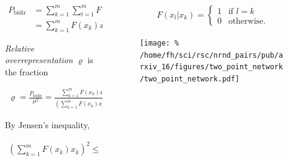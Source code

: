 \begin{frame}{}

    \begin{columns}
      \begin{column}{.5\textwidth}
        \minipage[c][0.85\textheight][s]{\columnwidth}

        \begin{align*}
          P_{\text{bidir}} &= \sum_{k=1}^m \sum_{l=1}^m F(x_k) x_k F(x_l | x_k) x_l \\ &= \sum_{k=1}^m F(x_k) x_k^2 .
\end{align*}


\textit{Relative overrepresentation} $\varrho$ is the fraction

\begin{align*}
  \varrho = \frac{P_{\text{bidir}}}{\mu^2} = \frac{\sum_{k=1}^m F(x_k) x_k^2 }{\left(\sum_{k=1}^m F(x_k) x_k\right)^2}.
\end{align*}

By Jensen's inequality,

\begin{align*}
  \left(\sum_{k=1}^m F(x_k) x_k\right)^2 \leq \sum_{k=1}^m F(x_k) x_k^2  \quad \text{and thus} \quad \varrho \geq 1.
\end{align*}	

        
        \endminipage      
      \end{column}
      \begin{column}{.5\textwidth}
        \minipage[c][0.85\textheight][s]{\columnwidth}

        \begin{align*}
  F(x_l | x_k) = \begin{cases} 1 & \text{if $l = k$} \\ 0 & \text{otherwise.} \end{cases}
        \end{align*}


        
        \begin{figure}
          \centering
          \texttt{[image: \%
          /home/fh/sci/rsc/nrnd\_pairs/pub/arxiv\_16/figures/two\_point\_network/two\_point\_network.pdf]} %
      \end{figure}

      \vspace{1.25cm}
        
        \endminipage
        
        
      \end{column}
    \end{columns}
    
  \end{frame}

